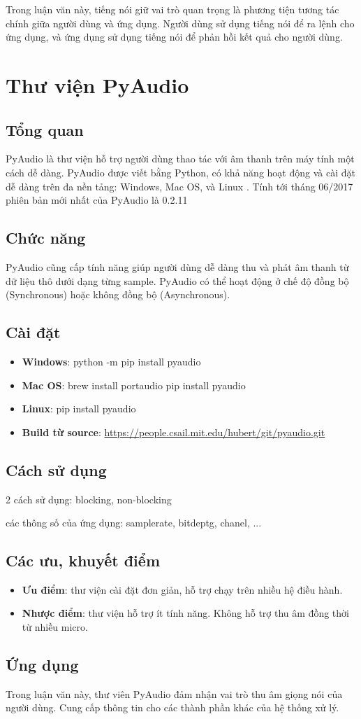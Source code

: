 Trong luận văn này, tiếng nói giữ vai trò quan trọng là phương tiện tương tác chính giữa người dùng và ứng dụng. Người dùng sử dụng tiếng nói để ra lệnh cho ứng dụng, và ứng dụng sử dụng tiếng nói để phản hồi kết quả cho người dùng.

\section{Thư viện PyAudio}
\subsection{Tổng quan}
PyAudio là thư viện hỗ trợ người dùng thao tác với âm thanh trên máy tính một cách dễ dàng. PyAudio được viết bằng Python, có khả năng hoạt động và cài đặt dễ dàng trên đa nền tảng: Windows, Mac OS, và Linux . Tính tới tháng 06/2017 phiên bản mới nhất của PyAudio là 0.2.11

\subsection{Chức năng}
PyAudio cũng cấp tính năng giúp người dùng dễ dàng thu và phát âm thanh từ dữ liệu thô dưới dạng từng sample. PyAudio có thể hoạt động ở chế độ đồng bộ (Synchronous) hoặc không đồng bộ (Asynchronous).

\subsection{Cài đặt}
\begin{itemize}
	\item \textbf{Windows}: python -m pip install pyaudio
	\item \textbf{Mac OS}: brew install portaudio 
pip install pyaudio
	\item \textbf{Linux}: pip install pyaudio
	\item \textbf{Build từ source}: \url{https://people.csail.mit.edu/hubert/git/pyaudio.git}
\end{itemize}

\subsection{Cách sử dụng}
2 cách sử dụng: blocking, non-blocking

các thông số của ứng dụng: samplerate, bitdeptg, chanel, ...
\subsection{Các ưu, khuyết điểm}
\begin{itemize}
	\item \textbf{Ưu điểm}: thư viện cài đặt đơn giản, hỗ trợ chạy trên nhiều hệ điều hành.
	\item \textbf{Nhược điểm}: thư viện hỗ trợ ít tính năng. Không hỗ trợ thu âm đồng thời từ nhiều micro.
\end{itemize}
\subsection{Ứng dụng}
Trong luận văn này, thư viên PyAudio đảm nhận vai trò thu âm giọng nói của người dùng. Cung cấp thông tin cho các thành phần khác của hệ thống xử lý.





